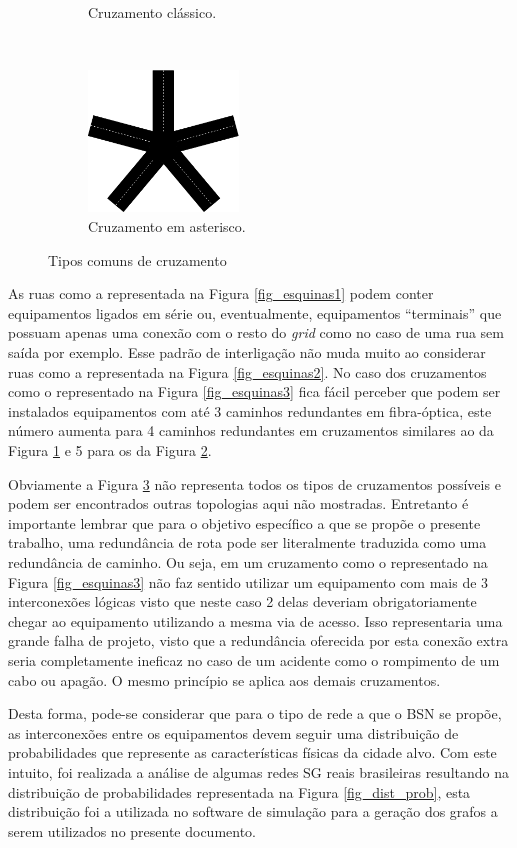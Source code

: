 \begin{figure}[t!]
\begin{subfigure}[t]{0.4\textwidth}
	\caption{Cruzamento clássico.}
	\label{fig_esquinas4}
	\end{subfigure}
	~
	\begin{subfigure}[t]{0.4\textwidth}
		\centering
		\includegraphics[width=4cm]{./figuras/esquinas5.png} %
	\caption{Cruzamento em asterisco.}
	\label{fig_esquinas5}
	\end{subfigure}
	\caption{Tipos comuns de cruzamento}
	\label{fig_esquinas}
\end{figure}

As ruas como a representada na Figura \ref{fig_esquinas1} podem conter equipamentos ligados em série ou, eventualmente, equipamentos ``terminais'' que possuam apenas uma conexão com o resto do \emph{grid} como no caso de uma rua sem saída por exemplo. Esse padrão de interligação não muda muito ao considerar ruas como a representada na Figura \ref{fig_esquinas2}. No caso dos cruzamentos como o representado na Figura \ref{fig_esquinas3} fica fácil perceber que podem ser instalados equipamentos com até 3 caminhos redundantes em fibra-óptica, este número aumenta para 4 caminhos redundantes em cruzamentos similares ao da Figura \ref{fig_esquinas4} e 5 para os da Figura \ref{fig_esquinas5}. 

Obviamente a Figura \ref{fig_esquinas} não representa todos os tipos de cruzamentos possíveis e podem ser encontrados outras topologias aqui não mostradas. Entretanto é importante lembrar que para o objetivo específico a que se propõe o presente trabalho, uma redundância de rota pode ser literalmente traduzida como uma redundância de caminho. Ou seja, em um cruzamento como o representado na Figura \ref{fig_esquinas3} não faz sentido utilizar um equipamento com mais de 3 interconexões lógicas visto que neste caso 2 delas deveriam obrigatoriamente chegar ao equipamento utilizando a mesma via de acesso. Isso representaria uma grande falha de projeto, visto que a redundância oferecida por esta conexão extra seria completamente ineficaz no caso de um acidente como o rompimento de um cabo ou apagão. O mesmo princípio se aplica aos demais cruzamentos.

Desta forma, pode-se considerar que para o tipo de rede a que o BSN se propõe, as interconexões entre os equipamentos devem seguir uma distribuição de probabilidades que represente as características físicas da cidade alvo. Com este intuito, foi realizada a análise de algumas redes SG reais brasileiras resultando na distribuição de probabilidades representada na Figura \ref{fig_dist_prob}, esta distribuição foi a utilizada no software de simulação para a geração dos grafos a serem utilizados no presente documento.

